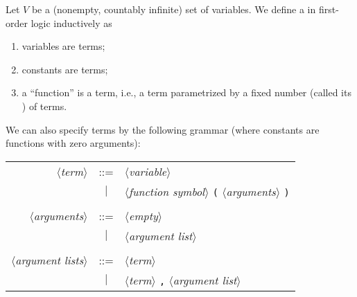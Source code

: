 \begin{definition}\label{fol-0002}%
Let $V$ be a (nonempty, countably infinite) set of variables. We define
a  in first-order logic inductively as
\begin{enumerate}
\item variables are terms;
\item constants are terms;
\item a ``function'' is a term, i.e., a term parametrized by a fixed
  number (called its ) of terms.
\end{enumerate}
We can also specify terms by the following grammar (where
constants are functions with zero arguments):
\begin{center}
\begin{tabular}{rcl}
$\langle$\textit{term}$\rangle$ & ::= & $\langle$\textit{variable}$\rangle$\\
& $|$ & $\langle$\textit{function symbol}$\rangle$ \verb#(# $\langle$\textit{arguments}$\rangle$ \verb#)#\\
  & & \\
$\langle$\textit{arguments}$\rangle$ & ::= & $\langle$\textit{empty}$\rangle$\\
  & $|$ & $\langle$\textit{argument list}$\rangle$\\
  & & \\
$\langle$\textit{argument lists}$\rangle$ & ::= & $\langle$\textit{term}$\rangle$\\
  & $|$ & $\langle$\textit{term}$\rangle$ \verb#,# $\langle$\textit{argument list}$\rangle$\\
\end{tabular}
\end{center}
\end{definition}

